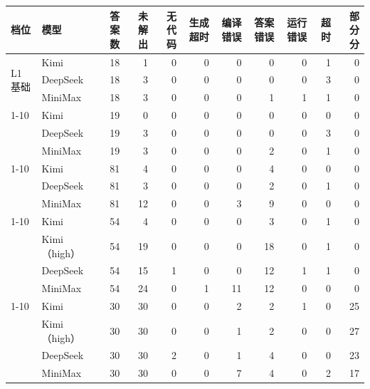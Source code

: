 \begin{tabular}{@{}llrrrrrrrrr@{}}
\toprule
档位 & 模型 & 答案数 & 未解出 & 无代码 & 生成超时 & 编译错误 & 答案错误 & 运行错误 & 超时 & 部分分 \\
\midrule
\multirow{3}{*}{L1 基础} & Kimi & 18 & 1 & 0 & 0 & 0 & 0 & 0 & 1 & 0 \\
 & DeepSeek & 18 & 3 & 0 & 0 & 0 & 0 & 0 & 3 & 0 \\
 & MiniMax & 18 & 3 & 0 & 0 & 0 & 1 & 1 & 1 & 0 \\
\cmidrule(lr){1-10}
\multirow{3}{*}{L2 中等} & Kimi & 19 & 0 & 0 & 0 & 0 & 0 & 0 & 0 & 0 \\
 & DeepSeek & 19 & 3 & 0 & 0 & 0 & 0 & 0 & 3 & 0 \\
 & MiniMax & 19 & 3 & 0 & 0 & 0 & 2 & 0 & 1 & 0 \\
\cmidrule(lr){1-10}
\multirow{3}{*}{L3 困难} & Kimi & 81 & 4 & 0 & 0 & 0 & 4 & 0 & 0 & 0 \\
 & DeepSeek & 81 & 3 & 0 & 0 & 0 & 2 & 0 & 1 & 0 \\
 & MiniMax & 81 & 12 & 0 & 0 & 3 & 9 & 0 & 0 & 0 \\
\cmidrule(lr){1-10}
\multirow{4}{*}{L4 顶尖} & Kimi & 54 & 4 & 0 & 0 & 0 & 3 & 0 & 1 & 0 \\
 & Kimi（high） & 54 & 19 & 0 & 0 & 0 & 18 & 0 & 1 & 0 \\
 & DeepSeek & 54 & 15 & 1 & 0 & 0 & 12 & 1 & 1 & 0 \\
 & MiniMax & 54 & 24 & 0 & 1 & 11 & 12 & 0 & 0 & 0 \\
\cmidrule(lr){1-10}
\multirow{4}{*}{L5 开放式} & Kimi & 30 & 30 & 0 & 0 & 2 & 2 & 1 & 0 & 25 \\
 & Kimi（high） & 30 & 30 & 0 & 0 & 1 & 2 & 0 & 0 & 27 \\
 & DeepSeek & 30 & 30 & 2 & 0 & 1 & 4 & 0 & 0 & 23 \\
 & MiniMax & 30 & 30 & 0 & 0 & 7 & 4 & 0 & 2 & 17 \\
\bottomrule
\end{tabular}
